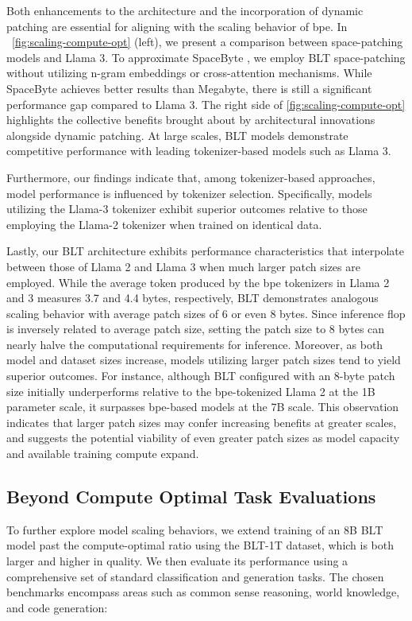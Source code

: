Both enhancements to the architecture and the incorporation of dynamic patching are essential for aligning with the scaling behavior of bpe. In ~\autoref{fig:scaling-compute-opt} (left), we present a comparison between space-patching models and Llama 3. To approximate SpaceByte \citep{slagle2024spacebyte}, we employ {\textsc BLT} space-patching without utilizing n-gram embeddings or cross-attention mechanisms. While SpaceByte achieves better results than Megabyte, there is still a significant performance gap compared to Llama 3. The right side of \autoref{fig:scaling-compute-opt} highlights the collective benefits brought about by architectural innovations alongside dynamic patching. At large scales, {\textsc BLT} models demonstrate competitive performance with leading tokenizer-based models such as Llama 3.

Furthermore, our findings indicate that, among tokenizer-based approaches, model performance is influenced by tokenizer selection. Specifically, models utilizing the Llama-3 tokenizer exhibit superior outcomes relative to those employing the Llama-2 tokenizer when trained on identical data.

Lastly, our {\textsc BLT} architecture exhibits performance characteristics that interpolate between those of Llama 2 and Llama 3 when much larger patch sizes are employed. While the average token produced by the bpe tokenizers in Llama 2 and 3 measures 3.7 and 4.4 bytes, respectively, {\textsc BLT} demonstrates analogous scaling behavior with average patch sizes of 6 or even 8 bytes. Since inference flop is inversely related to average patch size, setting the patch size to 8 bytes can nearly halve the computational requirements for inference. Moreover, as both model and dataset sizes increase, models utilizing larger patch sizes tend to yield superior outcomes. For instance, although {\textsc BLT} configured with an 8-byte patch size initially underperforms relative to the bpe-tokenized Llama 2 at the 1B parameter scale, it surpasses bpe-based models at the 7B scale. This observation indicates that larger patch sizes may confer increasing benefits at greater scales, and suggests the potential viability of even greater patch sizes as model capacity and available training compute expand.

\subsection{Beyond Compute Optimal Task Evaluations}
\label{section:evals}
To further explore model scaling behaviors, we extend training of an 8B {\textsc BLT} model past the compute-optimal ratio using the {\textsc BLT}-1T dataset, which is both larger and higher in quality. We then evaluate its performance using a comprehensive set of standard classification and generation tasks. The chosen benchmarks encompass areas such as common sense reasoning, world knowledge, and code generation:
